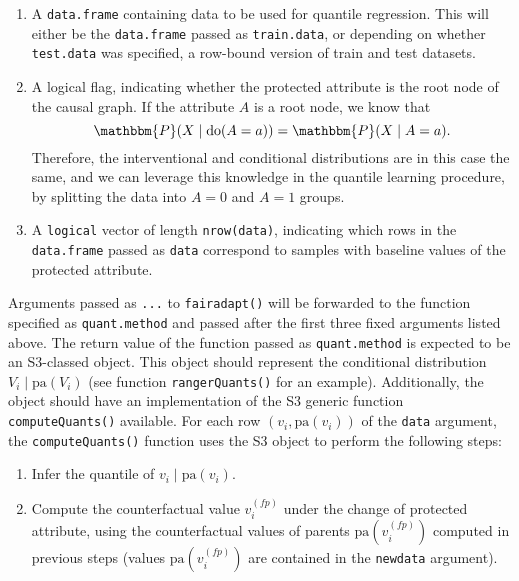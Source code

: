 \documentclass[
  nojss]{jss}
\providecommand{\tightlist}{%
  \setlength{\itemsep}{0pt}\setlength{\parskip}{0pt}}
\begin{document}
\begin{enumerate}
\def\labelenumi{\arabic{enumi}.}
\tightlist
\item
  A \texttt{data.frame} containing data to be used for quantile
  regression. This will either be the \texttt{data.frame} passed as
  \texttt{train.data}, or depending on whether \texttt{test.data} was
  specified, a row-bound version of train and test datasets.
\item
  A logical flag, indicating whether the protected attribute is the root
  node of the causal graph. If the attribute \(A\) is a root node, we
  know that
  \[\mathbbm{P}(X \mid \text{do}(A = a)) = \mathbbm{P}(X \mid A = a).\]
  Therefore, the interventional and conditional distributions are in
  this case the same, and we can leverage this knowledge in the quantile
  learning procedure, by splitting the data into \(A = 0\) and \(A = 1\)
  groups.
\item
  A \texttt{logical} vector of length \texttt{nrow(data)}, indicating
  which rows in the \texttt{data.frame} passed as \texttt{data}
  correspond to samples with baseline values of the protected attribute.
\end{enumerate}

Arguments passed as \texttt{...} to \texttt{fairadapt()} will be
forwarded to the function specified as \texttt{quant.method} and passed
after the first three fixed arguments listed above. The return value of
the function passed as \texttt{quant.method} is expected to be an
S3-classed object. This object should represent the conditional
distribution \(V_i \mid \mathrm{pa}(V_i)\) (see function
\texttt{rangerQuants()} for an example). Additionally, the object should
have an implementation of the S3 generic function
\texttt{computeQuants()} available. For each row
\((v_i, \mathrm{pa}(v_i))\) of the \texttt{data} argument, the
\texttt{computeQuants()} function uses the S3 object to perform the
following steps:

\begin{enumerate}
\def\labelenumi{(\roman{enumi})}
\tightlist
\item
  Infer the quantile of \(v_i \mid \mathrm{pa}(v_i)\).
\item
  Compute the counterfactual value \( {v}^{(fp)}_i\) under the change of
  protected attribute, using the counterfactual values of parents
  \(\mathrm{pa}( {v}^{(fp)}_i)\) computed in previous steps (values
  \(\mathrm{pa}( {v}^{(fp)}_i)\) are contained in the \texttt{newdata}
  argument).
\end{enumerate}
\end{document}
